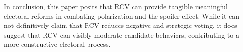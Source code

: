 \documentclass[12pt, a4paper, twoside]{article}
\begin{document}
In conclusion, this paper posits that RCV can provide tangible meaningful electoral reforms in combating polarization and the spoiler effect. While it can not definitively claim that RCV reduces negative and strategic voting, it does suggest that RCV can visibly moderate candidate behaviors, contributing to a more constructive electoral process.





\printbibliography
\end{document}
